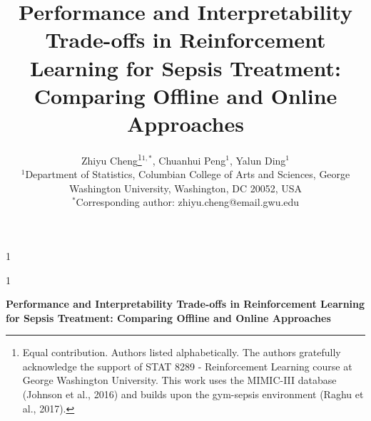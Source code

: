 \documentclass[11pt]{article}
\newcommand{\anon}{1}  %
\begin{document}
\def\spacingset#1{\renewcommand{\baselinestretch}{#1}\small\normalsize}
\spacingset{1}

\anon
{
  \title{\bf Performance and Interpretability Trade-offs in Reinforcement Learning for Sepsis Treatment: Comparing Offline and Online Approaches}
  \author{
    Zhiyu Cheng\thanks{Equal contribution. Authors listed alphabetically. The authors gratefully acknowledge the support of STAT 8289 - Reinforcement Learning course at George Washington University. This work uses the MIMIC-III database (Johnson et al., 2016) and builds upon the gym-sepsis environment (Raghu et al., 2017).}$^{1,*}$,
    Chuanhui Peng$^{1}$,
    Yalun Ding$^{1}$ \\
    $^{1}$Department of Statistics, Columbian College of Arts and Sciences, George Washington University, Washington, DC 20052, USA \\
    $^{*}$Corresponding author: zhiyu.cheng@email.gwu.edu
  }
  \maketitle
} \fi

\anon
{
  \bigskip
  \bigskip
  \bigskip
  \begin{center}
    {\LARGE\bf Performance and Interpretability Trade-offs in Reinforcement Learning for Sepsis Treatment: Comparing Offline and Online Approaches}
\end{center}
  \medskip
} \fi
\end{document}
